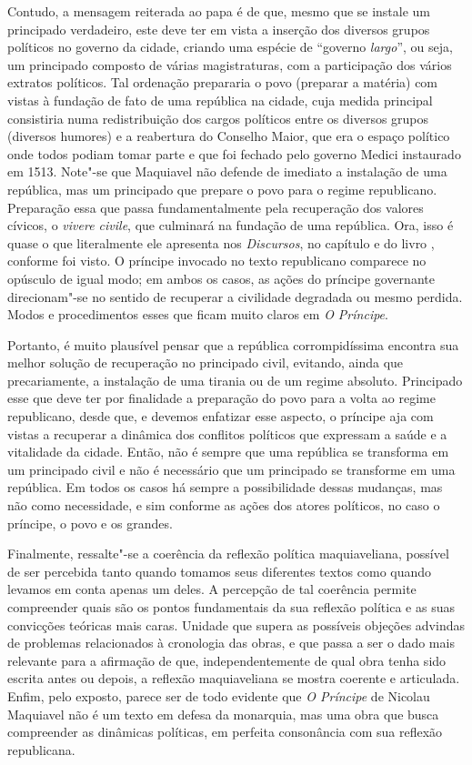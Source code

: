 Contudo, a mensagem reiterada ao papa é de que, mesmo que se instale um
principado verdadeiro, este deve ter em vista a inserção dos diversos
grupos políticos no governo da cidade, criando uma espécie de ``governo
\emph{largo}'', ou seja, um principado composto de várias magistraturas,
com a participação dos vários extratos políticos. Tal ordenação
prepararia o povo (preparar a matéria) com vistas à fundação de fato de
uma república na cidade, cuja medida principal consistiria numa
redistribuição dos cargos políticos entre os diversos grupos (diversos
humores) e a reabertura do Conselho Maior, que era o espaço político
onde todos podiam tomar parte e que foi fechado pelo governo Medici
instaurado em 1513. Note"-se que Maquiavel não defende de imediato a
instalação de uma república, mas um principado que prepare o povo para o
regime republicano. Preparação essa que passa fundamentalmente pela
recuperação dos valores cívicos, o \emph{vivere civile}, que culminará
na fundação de uma república. Ora, isso é quase o que literalmente ele
apresenta nos \emph{Discursos}, no capítulo  e  do livro , conforme
foi visto. O príncipe invocado no texto republicano comparece no
opúsculo de igual modo; em ambos os casos, as ações do príncipe
governante direcionam"-se no sentido de recuperar a civilidade degradada
ou mesmo perdida. Modos e procedimentos esses que ficam muito claros em
\emph{O Príncipe}.

Portanto, é muito plausível pensar que a república corrompidíssima
encontra sua melhor solução de recuperação no principado civil,
evitando, ainda que precariamente, a instalação de uma tirania ou de um
regime absoluto. Principado esse que deve ter por finalidade a
preparação do povo para a volta ao regime republicano, desde que, e
devemos enfatizar esse aspecto, o príncipe aja com vistas a recuperar a
dinâmica dos conflitos políticos que expressam a saúde e a vitalidade da
cidade. Então, não é sempre que uma república se transforma em um
principado civil e não é necessário que um principado se transforme em
uma república. Em todos os casos há sempre a possibilidade dessas
mudanças, mas não como necessidade, e sim conforme as ações dos atores
políticos, no caso o príncipe, o povo e os grandes.

Finalmente, ressalte"-se a coerência da reflexão política maquiaveliana,
possível de ser percebida tanto quando tomamos seus diferentes textos
como quando levamos em conta apenas um deles. A percepção de tal
coerência permite compreender quais são os pontos fundamentais da sua
reflexão política e as suas convicções teóricas mais caras. Unidade que
supera as possíveis objeções advindas de problemas relacionados à
cronologia das obras, e que passa a ser o dado mais relevante para a
afirmação de que, independentemente de qual obra tenha sido escrita
antes ou depois, a reflexão maquiaveliana se mostra coerente e
articulada. Enfim, pelo exposto, parece ser de todo evidente que \emph{O
Príncipe} de Nicolau Maquiavel não é um texto em defesa da monarquia,
mas uma obra que busca compreender as dinâmicas políticas, em perfeita
consonância com sua reflexão republicana.
